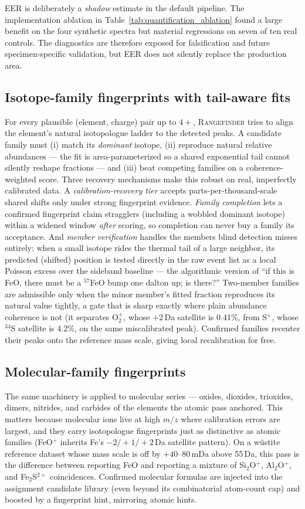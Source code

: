 \documentclass[11pt]{article}
\newcommand{\rf}{\textsc{Rangefinder}}
\begin{document}
EER is deliberately a \emph{shadow} estimate in the default pipeline. The
implementation ablation in Table~\ref{tab:quantification_ablation} found a
large benefit on the four synthetic spectra but material regressions on
seven of ten real controls. The diagnostics are therefore exposed for
falsification and future specimen-specific validation, but EER does not
silently replace the production area.

\subsection{Isotope-family fingerprints with tail-aware fits}
For every plausible (element, charge) pair up to $4+$, \rf{} tries to
align the element's natural isotopologue ladder to the detected peaks. A
candidate family must (i) match its \emph{dominant} isotope, (ii)
reproduce natural relative abundances --- the fit is
area-parameterized so a shared exponential tail cannot silently reshape
fractions --- and (iii) beat competing families on a coherence-weighted
score. Three recovery mechanisms make this robust on real, imperfectly
calibrated data. A \emph{calibration-recovery tier} accepts
parts-per-thousand-scale shared shifts only under strong fingerprint
evidence. \emph{Family completion} lets a confirmed fingerprint claim
stragglers (including a wobbled dominant isotope) within a widened window
\emph{after} scoring, so completion can never buy a family its
acceptance. And \emph{member verification} handles the members blind
detection misses entirely: when a small isotope rides the thermal tail of
a large neighbor, its predicted (shifted) position is tested directly in
the raw event list as a local Poisson excess over the sideband baseline
--- the algorithmic version of ``if this is FeO, there must be a
$^{57}$FeO bump one dalton up; is there?'' Two-member families are
admissible only when the minor member's fitted fraction reproduces its
natural value tightly, a gate that is sharp exactly where plain
abundance coherence is not (it separates O$_2^+$, whose $+2$\,Da
satellite is 0.41\%, from S$^+$, whose $^{34}$S satellite is 4.2\%, on
the same miscalibrated peak). Confirmed families recenter their peaks
onto the reference mass scale, giving local recalibration for free.

\subsection{Molecular-family fingerprints}
The same machinery is applied to molecular series --- oxides,
dioxides, trioxides, dimers, nitrides, and carbides of the elements the
atomic pass anchored. This matters because molecular ions live at high
$m/z$ where calibration errors are largest, and they carry isotopologue
fingerprints just as distinctive as atomic families (FeO$^+$ inherits
Fe's $-2/+1/+2$\,Da satellite pattern). On a w\"ustite reference dataset
whose mass scale is off by $+40$--$80$\,mDa above 55\,Da, this pass is
the difference between reporting FeO and reporting a mixture of
Si$_2$O$^+$, Al$_2$O$^+$, and Fe$_2$S$^{2+}$ coincidences. Confirmed
molecular formulas are injected into the assignment candidate library
(even beyond its combinatorial atom-count cap) and boosted by a
fingerprint hint, mirroring atomic hints.
\end{document}
